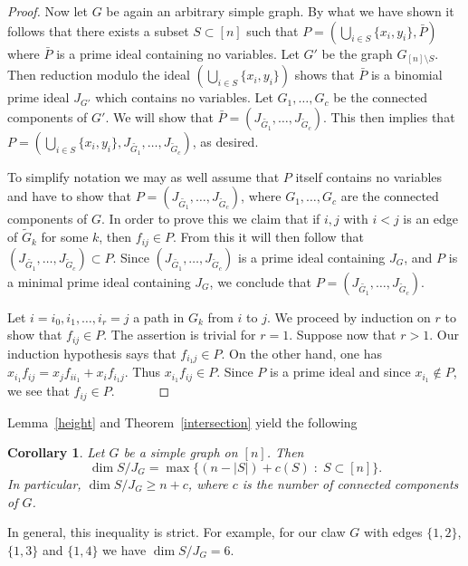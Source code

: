 \documentclass[11pt]{amsart}
\let\Union=\bigcup
\let\:=\colon
\newtheorem{Corollary}[Theorem]{Corollary}
\begin{document}
\begin{proof}
Now let $G$ be again an arbitrary simple graph. By what we have shown it follows that there exists a  subset $S\subset[n]$ such that $P=(\Union_{i\in S}\{x_i,y_i\}, \bar{P})$ where $\bar{P}$ is a prime ideal containing no variables. Let $G'$ be the graph $G_{[n]\setminus S}$. Then reduction modulo the ideal $(\Union_{i\in S}\{x_i,y_i\})$ shows that $\bar{P}$ is a binomial prime ideal $J_{G'}$ which contains no variables. Let $G_1, \ldots, G_c$ be the connected components of $G'$. We will show that $\bar{P}=(J_{\tilde{G_1}},\ldots, J_{\tilde{G}_{c}})$. This then implies that $P=(\Union_{i\in S}\{x_i,y_i\}, J_{\tilde{G_1}},\ldots, J_{\tilde{G}_{c}})$, as desired.

To simplify notation we may as well assume that $P$ itself contains no variables and have to show that $P=(J_{\tilde{G_1}},\ldots, J_{\tilde{G}_{c}})$, where $G_1,\ldots,G_c$ are the connected components of $G$. In order to prove this we claim that if $i,j$ with $i<j$ is an edge of $\tilde{G}_k$ for some $k$, then $f_{ij}\in P$. From this it will then follow that $(J_{\tilde{G_1}},\ldots, J_{\tilde{G}_{c}})\subset P$. Since $(J_{\tilde{G_1}},\ldots, J_{\tilde{G}_{c}})$ is a prime ideal containing $J_G$, and $P$ is a minimal prime ideal containing $J_G$,  we conclude that  $P=(J_{\tilde{G_1}},\ldots, J_{\tilde{G}_{c}})$.


Let $i=i_0,i_1,\ldots,i_r=j$ a path in $G_k$ from $i$ to $j$. We proceed by induction on $r$ to show that $f_{ij}\in P$. The assertion is trivial for $r=1$. Suppose now that $r>1$. Our induction hypothesis says that $f_{i_1 j}\in P$. On the other hand, one has $x_{i_1}f_{ij}=x_jf_{ii_1}+x_if_{i_1j}$.  Thus $x_{i_1}f_{ij}\in P$. Since $P$ is a prime ideal
and since $x_{i_1}\not \in P$, we see that $f_{ij}\in P$.
\, \, \, \, \, \,
\end{proof}


Lemma~\ref{height} and Theorem~\ref{intersection} yield the following

\begin{Corollary}
\label{dimension}
Let $G$ be a simple graph on $[n]$. Then $$\dim S/J_G=\max\{(n-|S|)+c(S)\;\:\; S\subset [n]\}.$$
In particular,  $\dim S/J_G\geq n+c$, where $c$ is the number of connected components of $G$.
\end{Corollary}

In general, this inequality is strict. For example, for our claw $G$ with edges $\{1,2\}$, $\{1,3\}$ and $\{1,4\}$ we have $\dim S/J_G=6$.
\end{document}
